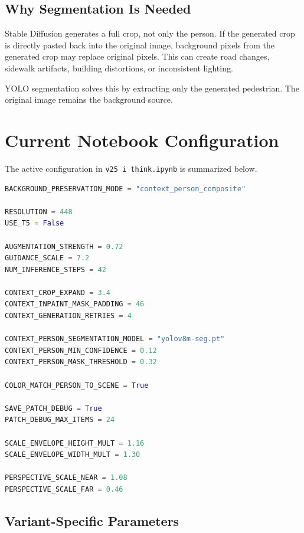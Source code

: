\documentclass[12pt,a4paper]{article}
\begin{document}
\subsection{Why Segmentation Is Needed}

Stable Diffusion generates a full crop, not only the person. If the generated
crop is directly pasted back into the original image, background pixels from the
generated crop may replace original pixels. This can create road changes,
sidewalk artifacts, building distortions, or inconsistent lighting.

YOLO segmentation solves this by extracting only the generated pedestrian. The
original image remains the background source.

\section{Current Notebook Configuration}

The active configuration in \texttt{v25 i think.ipynb} is summarized below.

\begin{lstlisting}[language=Python,caption={Current global generation configuration}]
BACKGROUND_PRESERVATION_MODE = "context_person_composite"

RESOLUTION = 448
USE_T5 = False

AUGMENTATION_STRENGTH = 0.72
GUIDANCE_SCALE = 7.2
NUM_INFERENCE_STEPS = 42

CONTEXT_CROP_EXPAND = 3.4
CONTEXT_INPAINT_MASK_PADDING = 46
CONTEXT_GENERATION_RETRIES = 4

CONTEXT_PERSON_SEGMENTATION_MODEL = "yolov8m-seg.pt"
CONTEXT_PERSON_MIN_CONFIDENCE = 0.12
CONTEXT_PERSON_MASK_THRESHOLD = 0.32

COLOR_MATCH_PERSON_TO_SCENE = True

SAVE_PATCH_DEBUG = True
PATCH_DEBUG_MAX_ITEMS = 24

SCALE_ENVELOPE_HEIGHT_MULT = 1.16
SCALE_ENVELOPE_WIDTH_MULT = 1.30

PERSPECTIVE_SCALE_NEAR = 1.08
PERSPECTIVE_SCALE_FAR = 0.46
\end{lstlisting}

\subsection{Variant-Specific Parameters}
\end{document}
